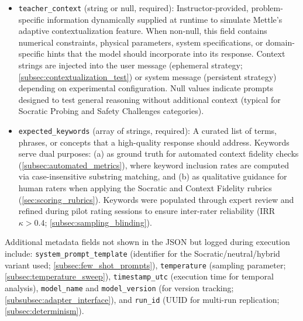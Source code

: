 \begin{itemize}[leftmargin=*]
    \item \texttt{teacher\_context} (string or null, required): Instructor-provided, problem-specific information dynamically supplied at runtime to simulate Mettle's adaptive contextualization feature. When non-null, this field contains numerical constraints, physical parameters, system specifications, or domain-specific hints that the model should incorporate into its response. Context strings are injected into the user message (ephemeral strategy; \cref{subsec:contextualization_test}) or system message (persistent strategy) depending on experimental configuration. Null values indicate prompts designed to test general reasoning without additional context (typical for Socratic Probing and Safety Challenges categories).

    \item \texttt{expected\_keywords} (array of strings, required): A curated list of terms, phrases, or concepts that a high-quality response should address. Keywords serve dual purposes: (a) as ground truth for automated context fidelity checks (\cref{subsec:automated_metrics}), where keyword inclusion rates are computed via case-insensitive substring matching, and (b) as qualitative guidance for human raters when applying the Socratic and Context Fidelity rubrics (\cref{sec:scoring_rubrics}). Keywords were populated through expert review and refined during pilot rating sessions to ensure inter-rater reliability (IRR $\kappa > 0.4$; \cref{subsec:sampling_blinding}).
\end{itemize}

Additional metadata fields not shown in the JSON but logged during execution include: \texttt{system\_prompt\_template} (identifier for the Socratic/neutral/hybrid variant used; \cref{subsec:few_shot_prompts}), \texttt{temperature} (sampling parameter; \cref{subsec:temperature_sweep}), \texttt{timestamp\_utc} (execution time for temporal analysis), \texttt{model\_name} and \texttt{model\_version} (for version tracking; \cref{subsubsec:adapter_interface}), and \texttt{run\_id} (UUID for multi-run replication; \cref{subsec:determinism}).
